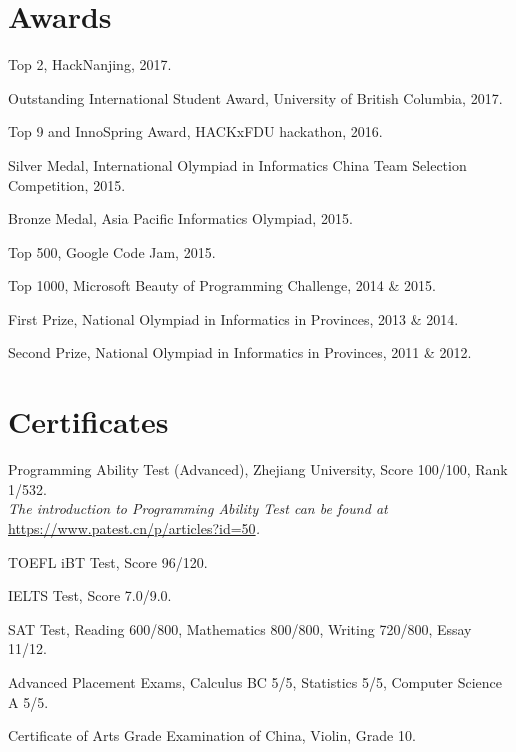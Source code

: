 \documentclass[letterpaper]{article}
\renewenvironment{itemize}{
  \begin{list}{}{
    \setlength{\leftmargin}{1.5em}
  }
}{
  \end{list}
}
\begin{document}
\section*{Awards}

\begin{itemize}
  \item Top 2, HackNanjing, 2017.

  \item Outstanding International Student Award, University of British Columbia, 2017.

  \item Top 9 and InnoSpring Award, HACKxFDU hackathon, 2016.

  \item Silver Medal, International Olympiad in Informatics China Team Selection Competition, 2015.

  \item Bronze Medal, Asia Pacific Informatics Olympiad, 2015.

  \item Top 500, Google Code Jam, 2015.

  \item Top 1000, Microsoft Beauty of Programming Challenge, 2014 \& 2015.

  \item First Prize, National Olympiad in Informatics in Provinces, 2013 \& 2014.

  \item Second Prize, National Olympiad in Informatics in Provinces, 2011 \& 2012.
\end{itemize}


\section*{Certificates}

\begin{itemize}
  \item Programming Ability Test (Advanced), Zhejiang University, Score 100/100, Rank 1/532.\\
  \emph{The introduction to Programming Ability Test can be found at }\url{https://www.patest.cn/p/articles?id=50}\emph{.}

  \item TOEFL iBT Test, Score 96/120.

  \item IELTS Test, Score 7.0/9.0.

  \item SAT Test, Reading 600/800, Mathematics 800/800, Writing 720/800, Essay 11/12.

  \item Advanced Placement Exams, Calculus BC 5/5, Statistics 5/5, Computer Science A 5/5.

  \item Certificate of Arts Grade Examination of China, Violin, Grade 10.
\end{itemize}
\end{document}
